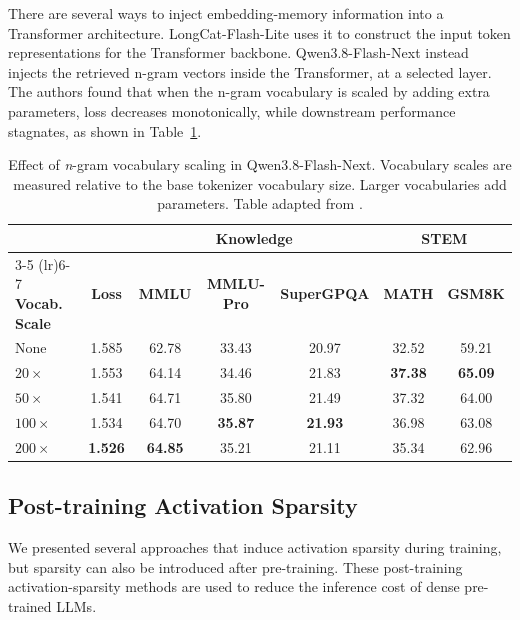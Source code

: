 There are several ways to inject embedding-memory information into a Transformer
architecture. LongCat-Flash-Lite \citep{liu2026scalingembeddingsoutperformsscaling} 
uses it to construct the input token representations for the Transformer backbone.
Qwen3.8-Flash-Next instead injects the retrieved n-gram vectors inside the
Transformer, at a selected layer.
The authors found that when the n-gram vocabulary is
scaled by adding extra parameters, loss decreases monotonically, while downstream
performance stagnates, as shown in Table~\ref{tab:qwen-ngram-vocab-scaling}.

\begin{table}[!ht]
    \centering
    \footnotesize
    \setlength{\tabcolsep}{4pt}
    \begin{tabular}{lcccccc}
        \toprule
        & & \multicolumn{3}{c}{\textbf{Knowledge}} & \multicolumn{2}{c}{\textbf{STEM}} \\
        \cmidrule(lr){3-5} \cmidrule(lr){6-7}
        \textbf{Vocab. Scale} & \textbf{Loss} & \textbf{MMLU} & \textbf{MMLU-Pro} & \textbf{SuperGPQA} & \textbf{MATH} & \textbf{GSM8K} \\
        \midrule
        None & 1.585 & 62.78 & 33.43 & 20.97 & 32.52 & 59.21 \\
        $20\times$ & 1.553 & 64.14 & 34.46 & 21.83 & \textbf{37.38} & \textbf{65.09} \\
        $50\times$ & 1.541 & 64.71 & 35.80 & 21.49 & 37.32 & 64.00 \\
        $100\times$ & 1.534 & 64.70 & \textbf{35.87} & \textbf{21.93} & 36.98 & 63.08 \\
        $200\times$ & \textbf{1.526} & \textbf{64.85} & 35.21 & 21.11 & 35.34 & 62.96 \\
        \bottomrule
    \end{tabular}
    \caption{Effect of \textit{n}-gram vocabulary scaling in Qwen3.8-Flash-Next.
    Vocabulary scales are measured relative to the base tokenizer vocabulary
    size. Larger vocabularies add parameters. Table adapted from
    \citep{qwen2026qwen38next}.}
    \label{tab:qwen-ngram-vocab-scaling}
\end{table}

\subsection{Post-training Activation Sparsity}
We presented several approaches that induce activation sparsity during training,
but sparsity can also be introduced after pre-training. These post-training
activation-sparsity methods are used to reduce the inference cost of dense
pre-trained LLMs.

